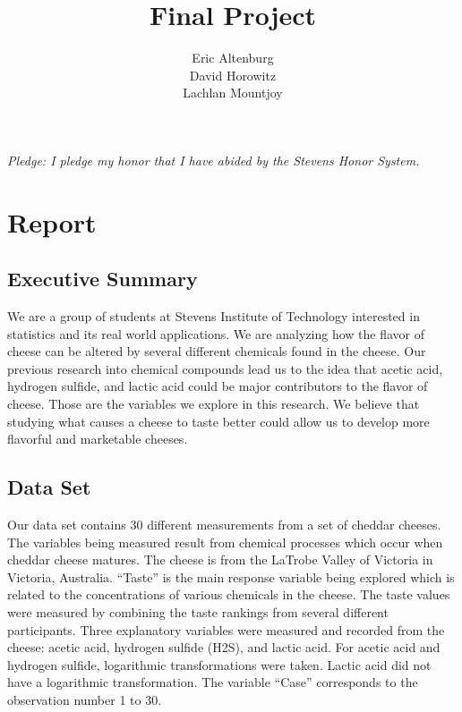 \documentclass[12pt]{article}
\title{Final Project}
\author{
Eric Altenburg\\
\And
David Horowitz\\
\And
Lachlan Mountjoy\\
}
\begin{document}
\maketitle

\begin{center}
	\textit{Pledge: I pledge my honor that I have abided by the Stevens Honor System.}
\end{center}


\section{Report}
	\begin{doublespace}
	\subsection{Executive Summary}
		We are a group of students at Stevens Institute of Technology interested in statistics and its real world applications. We are analyzing how the flavor of cheese can be altered by several different chemicals found in the cheese. Our previous research into chemical compounds lead us to the idea that acetic acid, hydrogen sulfide, and lactic acid could be major contributors to the flavor of cheese. Those are the variables we explore in this research. We believe that studying what causes a cheese to taste better could allow us to develop more flavorful and marketable cheeses.\par
	
	\subsection{Data Set}
		Our data set contains 30 different measurements from a set of cheddar cheeses. The variables being measured result from chemical processes which occur when cheddar cheese matures. The cheese is from the LaTrobe Valley of Victoria in Victoria, Australia. “Taste” is the main response variable being explored which is related to the concentrations of various chemicals in the cheese. The taste values were measured by combining the taste rankings from several different participants. Three explanatory variables were measured and recorded from the cheese: acetic acid, hydrogen sulfide (H2S), and lactic acid. For acetic acid and hydrogen sulfide, logarithmic transformations were taken. Lactic acid did not have a logarithmic transformation. The variable “Case” corresponds to the observation number 1 to 30. \par
		

\end{doublespace}
\end{document}
